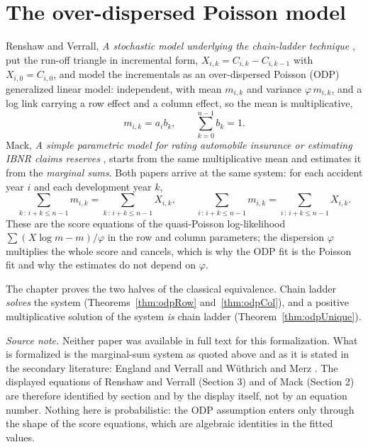 
\chapter{The over-dispersed Poisson model}

Renshaw and Verrall, \emph{A stochastic model underlying the chain-ladder technique}
\cite{RenshawVerrall1998}, put the run-off triangle in incremental
form, $X_{i,k} = C_{i,k} - C_{i,k-1}$ with $X_{i,0} = C_{i,0}$, and model the
incrementals as an over-dispersed Poisson (ODP) generalized linear model: independent,
with mean $m_{i,k}$ and variance $\varphi\, m_{i,k}$, and a log link carrying a row
effect and a column effect, so the mean is multiplicative,
\[
  m_{i,k} = a_i b_k , \qquad \sum_{k=0}^{n-1} b_k = 1 .
\]
Mack, \emph{A simple parametric model for rating automobile insurance or estimating
IBNR claims reserves} \cite{Mack1991}, starts from the same
multiplicative mean and estimates it from the \emph{marginal sums}. Both papers arrive
at the same system: for each accident year $i$ and each development year $k$,
\[
  \sum_{k \,:\, i+k \le n-1} m_{i,k} = \sum_{k \,:\, i+k \le n-1} X_{i,k},
  \qquad
  \sum_{i \,:\, i+k \le n-1} m_{i,k} = \sum_{i \,:\, i+k \le n-1} X_{i,k}.
\]
These are the score equations of the quasi-Poisson log-likelihood
$\sum (X \log m - m)/\varphi$ in the row and column parameters; the dispersion
$\varphi$ multiplies the whole score and cancels, which is why the ODP fit is the
Poisson fit and why the estimates do not depend on $\varphi$.

The chapter proves the two halves of the classical equivalence. Chain ladder
\emph{solves} the system (Theorems~\ref{thm:odpRow} and~\ref{thm:odpCol}), and a
positive multiplicative solution of the system \emph{is} chain ladder
(Theorem~\ref{thm:odpUnique}).

\emph{Source note.} Neither paper was available in full text for this formalization.
What is formalized is the marginal-sum system as quoted above and as it is stated in
the secondary literature: England and Verrall \cite[Section 2.3]{EnglandVerrall2002}
and W\"uthrich and Merz \cite[Section 2.3]{WuthrichMerz2008}. The displayed equations of Renshaw and
Verrall (Section 3) and of Mack (Section 2) are therefore identified by section and by
the display itself, not by an equation number. Nothing here is probabilistic: the ODP
assumption enters only through the shape of the score equations, which are algebraic
identities in the fitted values.

